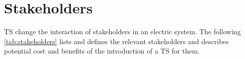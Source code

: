 


\section{Stakeholders}

TS change the interaction of stakeholders in an electric system. The following \cref{tab:stakeholders} lists and defines the relevant stakeholders and describes potential cost and benefits of the introduction of a TS for them.
 
